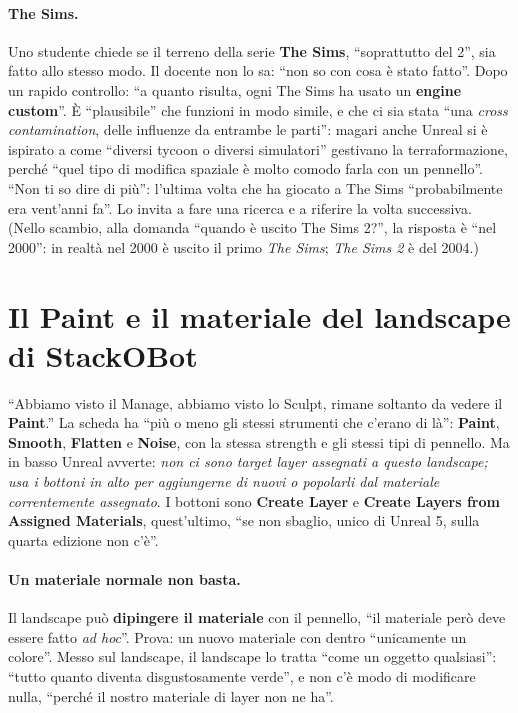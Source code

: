\paragraph{The Sims.} Uno studente chiede se il terreno della serie \textbf{The Sims}, ``soprattutto
del 2'', sia fatto allo stesso modo. Il docente non lo sa: ``non so con cosa è stato fatto''.
Dopo un rapido controllo: ``a quanto risulta, ogni The Sims ha usato un \textbf{engine custom}''.
È ``plausibile'' che funzioni in modo simile, e che ci sia stata ``una \emph{cross
contamination}, delle influenze da entrambe le parti'': magari anche Unreal si è ispirato a
come ``diversi tycoon o diversi simulatori'' gestivano la terraformazione, perché ``quel tipo
di modifica spaziale è molto comodo farla con un pennello''. ``Non ti so dire di più'':
l'ultima volta che ha giocato a The Sims ``probabilmente era vent'anni fa''. Lo invita a fare
una ricerca e a riferire la volta successiva. (Nello scambio, alla domanda ``quando è uscito
The Sims 2?'', la risposta è ``nel 2000'': in realtà nel 2000 è uscito il primo
\emph{The Sims}; \emph{The Sims 2} è del 2004.)

\section{Il Paint e il materiale del landscape di StackOBot}
\label{ue14:sec:paint}

``Abbiamo visto il Manage, abbiamo visto lo Sculpt, rimane soltanto da vedere il
\textbf{Paint}.'' La scheda ha ``più o meno gli stessi strumenti che c'erano di là'':
\textbf{Paint}, \textbf{Smooth}, \textbf{Flatten} e \textbf{Noise}, con la stessa strength e
gli stessi tipi di pennello. Ma in basso Unreal avverte: \emph{non ci sono target layer
assegnati a questo landscape; usa i bottoni in alto per aggiungerne di nuovi o popolarli
dal materiale correntemente assegnato}. I bottoni sono \textbf{Create Layer} e
\textbf{Create Layers from Assigned Materials}, quest'ultimo, ``se non sbaglio, unico di
Unreal 5, sulla quarta edizione non c'è''.

\paragraph{Un materiale normale non basta.} Il landscape può \textbf{dipingere il materiale}
con il pennello, ``il materiale però deve essere fatto \emph{ad hoc}''. Prova: un nuovo
materiale con dentro ``unicamente un colore''. Messo sul landscape, il landscape lo tratta
``come un oggetto qualsiasi'': ``tutto quanto diventa disgustosamente verde'', e non c'è modo
di modificare nulla, ``perché il nostro materiale di layer non ne ha''.

